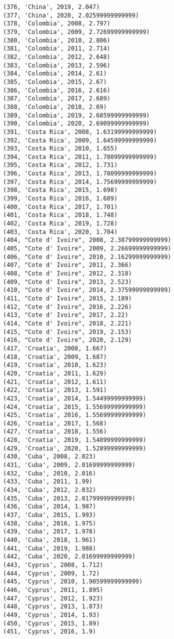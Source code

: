 \documentclass[11pt]{article}
\begin{document}
\begin{Verbatim}[commandchars=\\\{\}]
(376, 'China', 2019, 2.047)
(377, 'China', 2020, 2.02599999999999)
(378, 'Colombia', 2008, 2.797)
(379, 'Colombia', 2009, 2.72699999999999)
(380, 'Colombia', 2010, 2.806)
(381, 'Colombia', 2011, 2.714)
(382, 'Colombia', 2012, 2.648)
(383, 'Colombia', 2013, 2.596)
(384, 'Colombia', 2014, 2.61)
(385, 'Colombia', 2015, 2.67)
(386, 'Colombia', 2016, 2.616)
(387, 'Colombia', 2017, 2.689)
(388, 'Colombia', 2018, 2.69)
(389, 'Colombia', 2019, 2.68599999999999)
(390, 'Colombia', 2020, 2.69099999999999)
(391, 'Costa Rica', 2008, 1.63199999999999)
(392, 'Costa Rica', 2009, 1.64599999999999)
(393, 'Costa Rica', 2010, 1.655)
(394, 'Costa Rica', 2011, 1.78099999999999)
(395, 'Costa Rica', 2012, 1.731)
(396, 'Costa Rica', 2013, 1.78099999999999)
(397, 'Costa Rica', 2014, 1.75699999999999)
(398, 'Costa Rica', 2015, 1.698)
(399, 'Costa Rica', 2016, 1.689)
(400, 'Costa Rica', 2017, 1.701)
(401, 'Costa Rica', 2018, 1.748)
(402, 'Costa Rica', 2019, 1.728)
(403, 'Costa Rica', 2020, 1.704)
(404, "Cote d' Ivoire", 2008, 2.38799999999999)
(405, "Cote d' Ivoire", 2009, 2.26699999999999)
(406, "Cote d' Ivoire", 2010, 2.16299999999999)
(407, "Cote d' Ivoire", 2011, 2.366)
(408, "Cote d' Ivoire", 2012, 2.318)
(409, "Cote d' Ivoire", 2013, 2.523)
(410, "Cote d' Ivoire", 2014, 2.37599999999999)
(411, "Cote d' Ivoire", 2015, 2.189)
(412, "Cote d' Ivoire", 2016, 2.226)
(413, "Cote d' Ivoire", 2017, 2.22)
(414, "Cote d' Ivoire", 2018, 2.221)
(415, "Cote d' Ivoire", 2019, 2.153)
(416, "Cote d' Ivoire", 2020, 2.129)
(417, 'Croatia', 2008, 1.667)
(418, 'Croatia', 2009, 1.687)
(419, 'Croatia', 2010, 1.623)
(420, 'Croatia', 2011, 1.629)
(421, 'Croatia', 2012, 1.611)
(422, 'Croatia', 2013, 1.591)
(423, 'Croatia', 2014, 1.54499999999999)
(424, 'Croatia', 2015, 1.55699999999999)
(425, 'Croatia', 2016, 1.55699999999999)
(426, 'Croatia', 2017, 1.568)
(427, 'Croatia', 2018, 1.556)
(428, 'Croatia', 2019, 1.54899999999999)
(429, 'Croatia', 2020, 1.52899999999999)
(430, 'Cuba', 2008, 2.023)
(431, 'Cuba', 2009, 2.01699999999999)
(432, 'Cuba', 2010, 2.016)
(433, 'Cuba', 2011, 1.99)
(434, 'Cuba', 2012, 2.032)
(435, 'Cuba', 2013, 2.01799999999999)
(436, 'Cuba', 2014, 1.987)
(437, 'Cuba', 2015, 1.993)
(438, 'Cuba', 2016, 1.975)
(439, 'Cuba', 2017, 1.978)
(440, 'Cuba', 2018, 1.961)
(441, 'Cuba', 2019, 1.988)
(442, 'Cuba', 2020, 2.01699999999999)
(443, 'Cyprus', 2008, 1.712)
(444, 'Cyprus', 2009, 1.72)
(445, 'Cyprus', 2010, 1.90599999999999)
(446, 'Cyprus', 2011, 1.895)
(447, 'Cyprus', 2012, 1.923)
(448, 'Cyprus', 2013, 1.873)
(449, 'Cyprus', 2014, 1.93)
(450, 'Cyprus', 2015, 1.89)
(451, 'Cyprus', 2016, 1.9)

\end{Verbatim}
\end{document}
